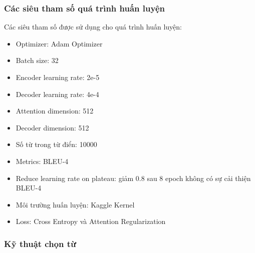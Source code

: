 \documentclass[14pt, a4paper]{article}
\numberwithin{equation}{section}
\numberwithin{algorithm}{section}
\numberwithin{figure}{section}
\numberwithin{table}{section}
\numberwithin{dl}{section}
\numberwithin{md}{section}
\numberwithin{bd}{section}
\numberwithin{dn}{section}
\numberwithin{hq}{section}
\begin{document}
    \subsubsection{Các siêu tham số quá trình huấn luyện}

    Các siêu tham số được sử dụng cho quá trình huấn luyện:

    \begin{itemize}
        \item Optimizer: Adam Optimizer
        \item Batch size: 32
        \item Encoder learning rate: 2e-5
        \item Decoder learning rate: 4e-4
        \item Attention dimension: 512
        \item Decoder dimension: 512
        \item Số từ trong từ điển: 10000
        \item Metrics: BLEU-4
        \item Reduce learning rate on plateau: giảm 0.8 sau 8 epoch không có sự cải thiện BLEU-4
        \item Môi trường huấn luyện: Kaggle Kernel
        \item Loss: Cross Entropy và Attention Regularization
    \end{itemize}

    \subsubsection{Kỹ thuật chọn từ}
\end{document}
